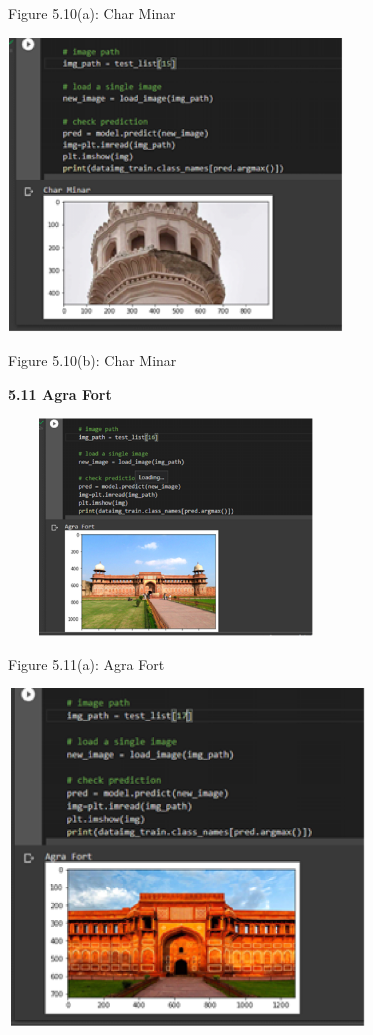 \documentclass[10pt]{article} %
\begin{document}
\noindent Figure 5.10(a): Char Minar

\noindent \includegraphics*[width=3.5in, height=3.07in, keepaspectratio=false]{image21}

\noindent Figure 5.10(b): Char Minar \newline

\noindent \textbf{}

\newpage
\noindent \textbf{5.11 Agra Fort} \newline

\noindent \includegraphics*[width=3.5in, height=2.27in, keepaspectratio=false]{image22}

\noindent Figure 5.11(a): Agra Fort

\noindent 

\noindent \includegraphics*[width=3.75in, height=3.53in, keepaspectratio=false]{image23}
\end{document}
